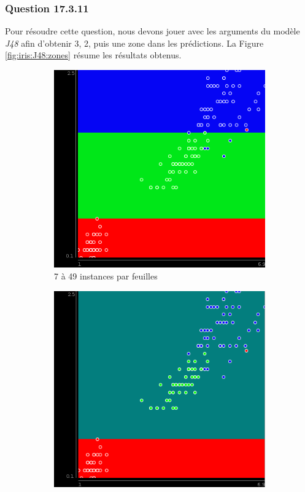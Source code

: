 \documentclass[10pt,a4paper]{article}
\begin{document}
   	
		   	\subsubsection*{Question 17.3.11}
		   	
		   	Pour résoudre cette question, nous devons jouer avec les arguments du modèle \textit{J48} afin d'obtenir 3, 2, puis une zone dans les prédictions. La Figure \ref{fig:iris:J48:zones} résume les résultats obtenus.
		   	
		   	\begin{figure}[!]
		   		\centering
		   		\begin{subfigure}{.333\textwidth}
		   			\centering
		   			\includegraphics[width=.9\textwidth]{iris_J48_3zones}
		   			\caption{7 à 49 instances par feuilles}
		   		\end{subfigure}%
		   		\begin{subfigure}{.333\textwidth}
		   			\centering
		   			\includegraphics[width=.9\textwidth]{iris_J48_2zones}

\end{subfigure}
\end{figure}
\end{document}
